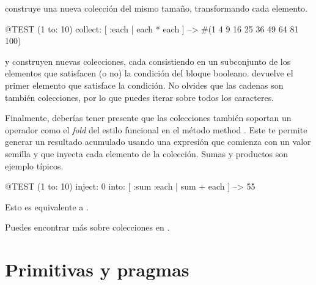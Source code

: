 \documentclass[a4paper,10pt,twoside]{book}
\begin{document}

 construye una nueva colección del mismo tamaño, transformando cada elemento.
\begin{code}{@TEST}
(1 to: 10) collect: [ :each | each * each ] --> #(1 4 9 16 25 36 49 64 81 100)
\end{code}

 y  construyen nuevas colecciones, cada  consistiendo en un subconjunto de los elementos que satisfacen (o no) la condición del bloque booleano.
 devuelve el primer elemento que satisface la condición.
No olvides que las cadenas son también colecciones, por lo que puedes iterar sobre todos los caracteres.


Finalmente, deberías tener presente que las colecciones también soportan un operador como el \emph{fold} del estilo funcional en el método  method .
Este te  permite generar un resultado acumulado usando una expresión que comienza con un valor semilla y que inyecta cada elemento de la colección.
Sumas y productos son ejemplo típicos.

\begin{code}{@TEST}
(1 to: 10) inject: 0 into: [ :sum :each | sum + each ] --> 55
\end{code}

\noindent
Esto es equivalente a .

Puedes encontrar más sobre colecciones en  .

\section{Primitivas y pragmas}
\end{document}
